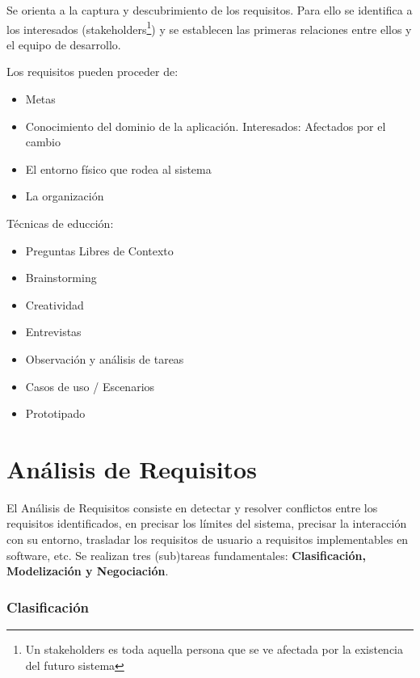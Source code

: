 Se orienta a la captura y descubrimiento de los requisitos. Para ello
se identifica a los interesados (stakeholders\footnote{Un stakeholders
  es toda aquella persona que se ve afectada por la existencia del
  futuro sistema}) y se establecen las primeras relaciones entre ellos
y el equipo de desarrollo.

Los requisitos pueden proceder de:
\begin{itemize}[noitemsep]
\item Metas
\item Conocimiento del dominio de la aplicación. Interesados: Afectados por el cambio
\item El entorno físico que rodea al sistema
\item La organización
\end{itemize}

Técnicas de educción:
\begin{itemize}[noitemsep]
\item Preguntas Libres de Contexto
\item Brainstorming
\item Creatividad
\item Entrevistas
\item Observación y análisis de tareas
\item Casos de uso / Escenarios
\item Prototipado
\end{itemize}

\section{Análisis de Requisitos}
\label{sec:requisitos:analisis}

El Análisis de Requisitos consiste en detectar y resolver conflictos
entre los requisitos identificados, en precisar los límites del
sistema, precisar la interacción con su entorno, trasladar los
requisitos de usuario a requisitos implementables en software, etc. Se
realizan tres (sub)tareas fundamentales: \textbf{Clasificación, Modelización y
Negociación}.

\subsubsection{Clasificación}
\label{sec:requisitos:analisis:clasificacion}

